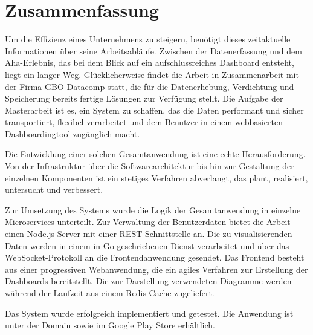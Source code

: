 \chapter*{Zusammenfassung}
\label{chap:zusammenfassung}

Um die Effizienz eines Unternehmens zu steigern, benötigt dieses zeitaktuelle Informationen über seine Arbeitsabläufe.
Zwischen der Datenerfassung und dem Aha-Erlebnis, das bei dem Blick auf ein aufschlussreiches Dashboard entsteht, liegt ein
langer Weg. Glücklicherweise findet die Arbeit in Zusammenarbeit mit der Firma GBO Datacomp statt, die für die
Datenerhebung, Verdichtung und Speicherung bereits fertige Lösungen zur Verfügung stellt. Die Aufgabe der Masterarbeit
ist es, ein System zu schaffen, das die Daten performant und sicher transportiert, flexibel verarbeitet und dem Benutzer
in einem webbasierten Dashboardingtool zugänglich macht.

Die Entwicklung einer solchen Gesamtanwendung ist eine echte Herausforderung. Von der Infrastruktur
über die Softwarearchitektur bis hin zur Gestaltung der einzelnen Komponenten ist ein stetiges
Verfahren abverlangt, das plant, realisiert, untersucht und verbessert.

Zur Umsetzung des Systems wurde die Logik der Gesamtanwendung in einzelne Microservices
unterteilt. Zur Verwaltung der Benutzerdaten bietet die Arbeit einen Node.js Server
mit einer REST-Schnittstelle an. Die zu visualisierenden Daten werden in einem
in Go geschriebenen Dienst verarbeitet und über das WebSocket-Protokoll an die
Frontendanwendung gesendet. Das Frontend besteht aus einer progressiven Webanwendung,
die ein agiles Verfahren zur Erstellung der Dashboards bereitstellt. Die zur Darstellung
verwendeten Diagramme werden während der Laufzeit aus einem Redis-Cache zugeliefert.

Das System wurde erfolgreich implementiert und getestet. Die Anwendung ist unter der Domain 
sowie im Google Play Store erhältlich.
